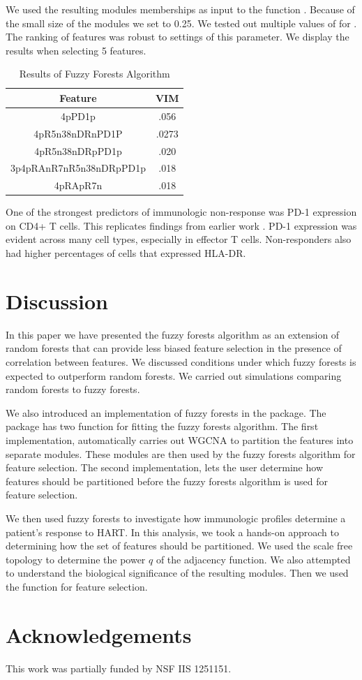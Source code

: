 \documentclass[article,shortnames]{jss}
\begin{document}
 We used the resulting modules memberships as input to the function .
Because of the small size of the modules we set  to 0.25.  We tested out multiple
values of for .  The ranking of features was robust to settings of this
parameter.   We display the results when selecting 5 features.
\begin{table}
\centering
\caption{Results of Fuzzy Forests Algorithm}
\begin{tabular}[h]{c c}
Feature & VIM\\
\hline
4pPD1p & .056\\
4pR5n38nDRnPD1P & .0273\\
4pR5n38nDRpPD1p & .020\\
3p4pRAnR7nR5n38nDRpPD1p & .018\\
4pRApR7n & .018
\end{tabular}
\end{table}

One of the strongest predictors of immunologic non-response was PD-1 expression on CD4+ T cells.
This replicates findings from earlier work \cite{hunt2008relationship}.  PD-1 expression was evident across many cell types, 
especially in effector T cells.  Non-responders also had higher percentages of cells that expressed
HLA-DR.  


\section{Discussion}
In this paper we have presented the fuzzy forests algorithm as an extension of random forests that can provide less biased feature selection in 
 the presence of correlation between features.  We discussed conditions under which fuzzy forests is expected
 to outperform random forests.  We carried out simulations comparing random forests to fuzzy forests.     
 
 We also introduced an implementation of fuzzy forests in the  package.  
 The  package has two function for fitting the fuzzy forests algorithm.  The first implementation,  automatically 
 carries out WGCNA to partition the features into separate modules.  These modules are then used by the fuzzy forests algorithm for feature selection.
 The second implementation,  lets the user determine how features should be partitioned before the fuzzy forests algorithm is used 
 for feature selection.  
 
We then used fuzzy forests to investigate how immunologic profiles determine a patient's response to HART.
 In this analysis, we took a hands-on approach to determining how the set of features
 should be partitioned.  We used the scale free topology to determine the power $q$ of the adjacency function.
 We also attempted to understand the biological significance of the resulting modules.
 Then we used the  function for feature selection.         
 
\section*{Acknowledgements}
This work was partially funded by NSF IIS 1251151.


\end{document}
